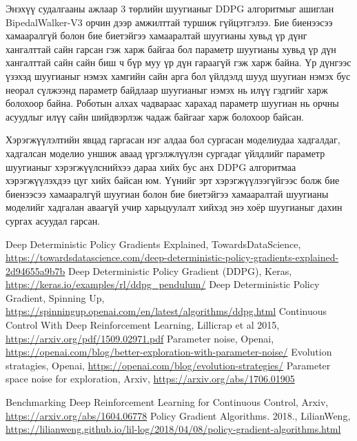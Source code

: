 \documentclass[12pt,A4]{report}
\begin{document}

Энэхүү судалгааны ажлаар 3 төрлийн шуугианыг DDPG алгоритмыг ашиглан BipedalWalker-V3 орчин дээр амжилттай туршиж гүйцэтгэлээ. Бие биенээсээ хамааралгүй болон бие биетэйгээ хамааралтай шуугианы хувьд үр дүнг хангалттай сайн гарсан гэж харж байгаа бол параметр шуугианы хувьд үр дүн хангалттай сайн сайн биш ч бүр муу үр дүн гараагүй гэж харж байна. Үр дүнгээс үзэхэд шуугианыг нэмэх хамгийн сайн арга бол үйлдэлд шууд шуугиан нэмэх бус неорал сүлжээнд параметр байдлаар шуугианыг нэмэх нь илүү гэдгийг харж болохоор байна. Роботын алхах чадвараас харахад параметр шуугиан нь орчны асуудлыг илүү сайн шийдвэрлэж чадаж байгааг харж болохоор байсан. 

Хэрэгжүүлэлтийн явцад гаргасан нэг алдаа бол сургасан моделиудаа хадгалдаг, хадгалсан моделио уншиж аваад үргэлжлүүлэн сургадаг үйлдлийг параметр шуугианыг хэрэгжүүлснийхээ дараа хийх бус анх DDPG алгоритмаа хэрэгжүүлэхдээ цуг хийх байсан юм. Үүнийг эрт хэрэгжүүлээгүйгээс болж бие биенээсээ хамааралгүй шуугиан болон бие биетэйгээ хамааралтай шуугианы моделийг хадгалан аваагүй учир харьцуулалт хийхэд энэ хоёр шуугианыг дахин сургах асуудал гарсан.


\singlespace
{}
\begin{thebibliography}{}
	Deep Deterministic Policy Gradients Explained, TowardsDataScience, \url{https://towardsdatascience.com/deep-deterministic-policy-gradients-explained-2d94655a9b7b}
	Deep Deterministic Policy Gradient (DDPG),  Keras, \url{https://keras.io/examples/rl/ddpg_pendulum/}
	Deep Deterministic Policy Gradient, Spinning Up, \url{https://spinningup.openai.com/en/latest/algorithms/ddpg.html}
	Continuous Control With Deep Reinforcement Learning, Lillicrap et al 2015, \url{https://arxiv.org/pdf/1509.02971.pdf}
	Parameter noise,  Openai, \url{https://openai.com/blog/better-exploration-with-parameter-noise/}
	Evolution stratagies,  Openai, \url{https://openai.com/blog/evolution-strategies/}
	Parameter space noise for exploration,  Arxiv, \url{https://arxiv.org/abs/1706.01905}
	
	Benchmarking Deep Reinforcement Learning for Continuous Control,  Arxiv, \url{https://arxiv.org/abs/1604.06778}
	Policy Gradient Algorithms. 2018.,  LilianWeng, \url{https://lilianweng.github.io/lil-log/2018/04/08/policy-gradient-algorithms.html}
	
\end{thebibliography}
\end{document}
